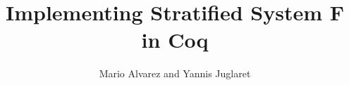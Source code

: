 \documentclass{beamer}
\title{Implementing Stratified System F in Coq}
\author{Mario Alvarez and Yannis Juglaret}
\date{\displaydate{date}}
\begin{document}
\begin{frame}
\titlepage
\end{frame}
\end{document}
